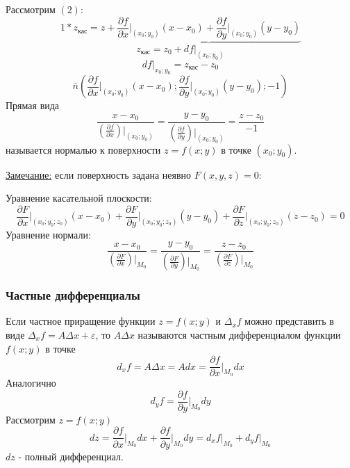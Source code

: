 \documentclass[12pt]{article}
\begin{document}
    Рассмотрим $(2)$:
    \[ 1 * z_{\text{кас}} = z + \underbrace{\frac{\partial f}{\partial x} \Big|_{(x_0; y_0)} (x-x_0) + \frac{\partial f}{\partial y} \Big|_{(x_0; y_0)} (y-y_0)} \]
    \[ z_{\text{кас}} = z_0 + df \Big|_{(x_0; y_0)} \]
    \[ df \Big|_{x_0; y_0} = z_{\text{кас}} - z_0 \]
    \[ \bar{n} \left(\frac{\partial f}{\partial x} \Big|_{(x_0; y_0)} (x-x_0); \frac{\partial f}{\partial y} \Big|_{(x_0; y_0)} (y-y_0); -1\right) \]
    Прямая вида
    \[ \frac{x - x_0}{\left( \frac{\partial f}{\partial x} \right) \Big|_{(x_0; y_0)}} = \frac{y - y_0}{\left( \frac{\partial f}{\partial y} \right) \Big|_{(x_0; y_0)}} = \frac{z - z_0}{-1} \]
    называется нормалью к поверхности $z = f(x; y)$ в точке $(x_0; y_0)$.\par\noindent
    \underline{Замечание:} если поверхность задана неявно $F(x,y,z) = 0$:
    \begin{adjustwidth}{1.5em}{1.5em}
        Уравнение касательной плоскости: 
        \[ \frac{\partial F}{\partial x} \Big|_{(x_0; y_0; z_0)} (x-x_0) + \frac{\partial F}{\partial y} \Big|_{(x_0; y_0; z_0)} (y-y_0) + \frac{\partial F}{\partial z} \Big|_{(x_0; y_0; z_0)} (z-z_0) = 0 \]
        Уравнение нормали:
        \[ \frac{x - x_0}{\left( \frac{\partial F}{\partial x} \right) \Big|_{M_0}} = \frac{y - y_0}{\left( \frac{\partial F}{\partial y} \right) \Big|_{M_0}} = \frac{z - z_0}{\left( \frac{\partial F}{\partial z} \right) \Big|_{M_0}} \]
    \end{adjustwidth}
    \subsubsection*{Частные дифференциалы}
    Если частное приращение функции $z = f(x;y)$ и $\Delta_x f$ можно представить в виде $\Delta_x f = A \Delta x + \varepsilon$, то $A \Delta x$ называются частным дифференциалом функции $f(x;y)$ в точке 
    \[ d_x f = A\Delta x = Adx = \frac{\partial f}{\partial x} \Big|_{M_0}dx \]
    Аналогично
    \[ d_y f = \frac{\partial f}{\partial y} \Big|_{M_0}dy \]
    Рассмотрим $z = f(x;y)$
    \[ dz = \frac{\partial f}{\partial x} \Big|_{M_0}dx + \frac{\partial f}{\partial y} \Big|_{M_0}dy = d_x f \Big|_{M_0} + d_y f \Big|_{M_0} \]
    $dz$ - полный дифференциал.
\end{document}
